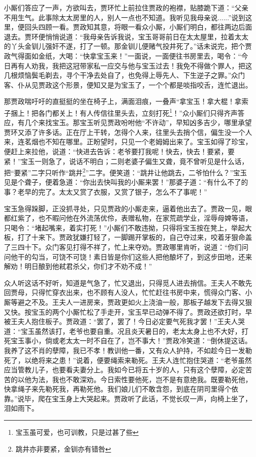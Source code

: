 \documentclass[12pt,oneside]{book}
\begin{document}
小厮们答应了一声，方欲叫去，贾环忙上前拉住贾政的袍襟，贴膝跪下道：“父亲不用生气。此事除太太房里的人，别人一点也不知道。我听见我母亲说......”说到这里，便回头四顾一看。贾政知其意，将眼一看众小厮，小厮们明白，都往两边后面退去。贾环便悄悄说道：“我母亲告诉我说，宝玉哥哥前日在太太屋里，拉着太太的丫头金钏儿强奸不遂，打了一顿。那金钏儿便赌气投井死了。”话未说完，把个贾政气得面如金纸，大喝：“快拿宝玉来！”一面说，一面便往书房里去，喝令：“今日再有人劝我，我把这冠带家私一应交与他与宝玉过去！我免不得做个罪人，把这几根烦恼鬓毛剃去，寻个干净去处自了，也免得上辱先人、下生逆子之罪。”众门客、仆从见贾政这个形景，便知又是为宝玉了，一个个都是啖指咬舌，连忙退出。

那贾政喘吁吁的直挺挺的坐在椅子上，满面泪痕，一叠声“拿宝玉！拿大棍！拿索子捆上！把各门都关上！有人传信往里头去，立刻打死\footnote{宝玉虽可爱，也可训教，只是过甚了些}！”众小厮们只得齐声答应，有几个来找宝玉。那宝玉听见贾政吩咐他“不许动”，早知凶多吉少，哪里承望贾环又添了许多话。正在厅上干转，怎得个人来，往里头去捎个信，偏生没一个人来，连茗烟也不知在哪里。正盼望时，只见一个老姆姆出来了。宝玉如得了珍宝，便赶上来拉他，说道：“快进去告诉：老爷要打我呢！快去，快去！要紧，要紧！”宝玉一则急了，说话不明白；二则老婆子偏生又聋，竟不曾听见是什么话，把“要紧”二字只听作“跳井\footnote{跳井亦非要紧，金钏亦有错咎}”二字。便笑道：“跳井让他跳去，二爷怕什么？”宝玉见是个聋子，便着急道：“你出去快叫我的小厮来罢！”那婆子道：“有什么不了的事？老早的完了。太太又赏了衣服，又赏了银子，怎么不了事呢！”

宝玉急得跺脚，正没抓寻处，只见贾政的小厮走来，逼着他出去了。贾政一见，眼都红紫了，也不暇问他在外流荡优伶，表赠私物，在家荒疏学业，淫辱母婢等语，只喝令：“堵起嘴来，着实打死！”小厮们不敢违拗，只得将宝玉按在凳上，举起大板，打了十来下。贾政犹嫌打轻了，一脚踢开掌板的，自己夺过来，咬着牙狠命盖了三四十下。众门客见打得不祥了，忙上来夺劝。贾政哪里肯听，说道：“你们问问他干的勾当，可饶不可饶！素日皆是你们这些人把他酿坏了，到这步田地，还来解劝！明日酿到他弒君杀父，你们才不劝不成！”

众人听这话不好听，知道是气急了，忙又退出，只得觅人进去捎信。王夫人不敢先回贾母，只得忙穿衣出来，也不顾有人没人，忙忙赶往书房中来，慌得众门客、小厮等避之不及。王夫人一进房来，贾政更如火上浇油一般，那板子越发下去得又狠又快。按宝玉的两个小厮忙松了手走开，宝玉早已动弹不得了。贾政还欲打时，早被王夫人抱住板子。贾政道：“罢了，罢了！今日必定要气死我才罢！”王夫人哭道：“宝玉虽然该打，老爷也要自重。况且炎天暑日的，老太太身上也不大好，打死宝玉事小，倘或老太太一时不自在了，岂不事大！”贾政冷笑道：“倒休提这话。我养了这不肖的孽障，我已不孝！教训他一番，又有众人护持，不如趁今日一发勒死了，以绝将来之患！”说着，便要绳索来勒死。王夫人连忙抱住哭道：“老爷虽然应当管教儿子，也要看夫妻分上。我如今已将五十岁的人，只有这个孽障，必定苦苦的以他为法，我也不敢深劝。今日索性要他死，岂不是有意绝我。既要勒死他，快拿绳子来先勒死我，再勒死他。我们娘儿们不敢含怨，到底在阴司里得个依靠。”说毕，爬在宝玉身上大哭起来。贾政听了此话，不觉长叹一声，向椅上坐了，泪如雨下。
\end{document}
